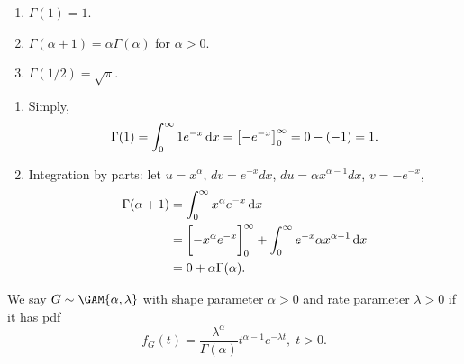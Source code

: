 \begin{Proposition}{}{}
    \begin{enumerate}
        \item $ \Gamma(1)=1 $.
        \item $ \Gamma(\alpha+1)=\alpha \Gamma(\alpha) $ for
              $ \alpha>0 $.
        \item $ \Gamma(1/2)=\sqrt{\pi} $.
    \end{enumerate}
    \tcblower{}
    \begin{enumerate}
        \item Simply,
              \[ \Gamma(1)=\int_{0}^{\infty}1 e^{-x}\odif{x}
                  =\bigl[-e^{-x}\bigr]_{0}^\infty=0-(-1)=1. \]
        \item Integration by parts: let $ u=x^{\alpha} $, $
                  dv=e^{-x}dx $, $ du=\alpha x^{\alpha-1}dx $, $
                  v=-e^{-x} $,
              \begin{align*}
                  \Gamma(\alpha+1)
                   & =\int_{0}^{\infty}x^{\alpha}e^{-x}\odif{x}      \\
                   & =\biggl[-x^{\alpha}e^{-x}\biggr]_{0}^\infty+
                  \int_{0}^{\infty}e^{-x}\alpha x^{\alpha-1}\odif{x} \\
                   & =0+\alpha\Gamma(\alpha).
              \end{align*}
    \end{enumerate}
\end{Proposition}
\begin{Definition}{}{}
    We say $ G\sim\GAM{\alpha,\lambda} $ with shape
    parameter $ \alpha>0 $ and rate parameter $ \lambda>0 $
    if it has pdf
    \[
        f_G(t)=\frac{\lambda^{\alpha}}{\Gamma(\alpha)}t^{\alpha-1}e^{-\lambda
        t},\; t>0. \]
\end{Definition}
